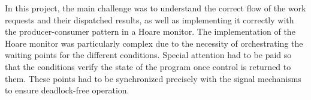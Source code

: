 \documentclass{article}
\begin{document}
    In this project, the main challenge was to understand the correct flow of the work requests and their dispatched results, as well as implementing it correctly with the producer-consumer pattern in a Hoare monitor.
    The implementation of the Hoare monitor was particularly complex due to the necessity of orchestrating the waiting points for the different conditions.
    Special attention had to be paid so that the conditions verify the state of the program once control is returned to them.
    These points had to be synchronized precisely with the signal mechanisms to ensure deadlock-free operation.
\end{document}
